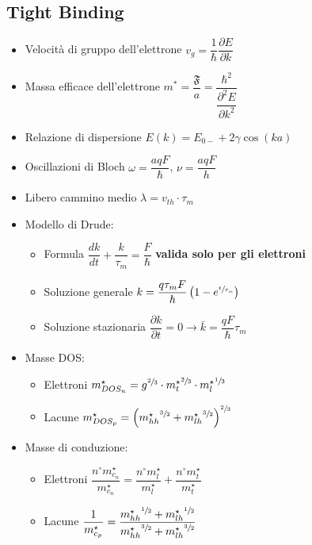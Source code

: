 \documentclass{article}
\begin{document}
\subsection{Tight Binding}
\begin{itemize}
  \item Velocità di gruppo dell'elettrone \( v_g = \dfrac{1}{\hbar} \dfrac{\partial E}{\partial k} \)
  \item Massa efficace dell'elettrone \( m ^ \ast = \dfrac{ \mathfrak{F} }{a} = \dfrac{\hbar ^ 2}{\dfrac{\partial ^ 2 E}{\partial k ^ 2}} \)
  \item Relazione di dispersione \( E(k) = E_{0-} + 2 \gamma \cos(ka) \)
  \item Oscillazioni di Bloch \( \omega = \dfrac{a q F}{\hbar} \), \( \nu = \dfrac{a q F}{h} \)
  \item Libero cammino medio \( \lambda = v_{th} \cdot \tau_m \)
  \item Modello di Drude:
        \begin{itemize}
          \item Formula \( \dfrac{dk}{dt} + \dfrac{k}{\tau_m}= \dfrac{F}{\hbar} \) \textbf{valida solo per gli elettroni}
          \item Soluzione generale \( k = \dfrac{q \tau_m F}{\hbar} \left( 1 - e^{\sfrac{t}{\tau_m}} \right) \)
          \item Soluzione stazionaria \( \dfrac{\partial k}{\partial t} = 0 \rightarrow \bar{k} = \dfrac{q F}{\hbar} \tau_m \)
        \end{itemize}
  \item Masse DOS:
        \begin{itemize}
          \item Elettroni \( m^{\star}_{DOS_n} = g ^ {\sfrac{2}{3}} \cdot {m^\star_t} ^ {\sfrac{2}{3}} \cdot {m^\star_l} ^ {\sfrac{1}{3}}  \)
          \item Lacune \( m^{\star}_{DOS_p} = \left( {m_{hh}^{\star}} ^ {\sfrac{3}{2}} + {m_{lh}^{\star}} ^ {\sfrac{3}{2}} \right) ^ {\sfrac{2}{3}} \)
        \end{itemize}
  \item Masse di conduzione:
        \begin{itemize}
          \item Elettroni \( \dfrac{n^{\circ} m^\star_{c_n}}{m^\star_{c_n}} = \dfrac{n^{\circ} m_l^\star}{m_l^\star} + \dfrac{n^{\circ} m_t^\star}{m_t^\star} \)
          \item Lacune \( \dfrac{1}{m^\star_{c_p}} = \dfrac{{m^\star_{hh}} ^ {\sfrac{1}{2}} + {m^\star_{lh}} ^ {\sfrac{1}{2}} }{{m^\star_{hh}} ^ {\sfrac{3}{2}} + {m^\star_{lh}} ^ {\sfrac{3}{2}} } \)
        \end{itemize}
\end{itemize}
\end{document}
